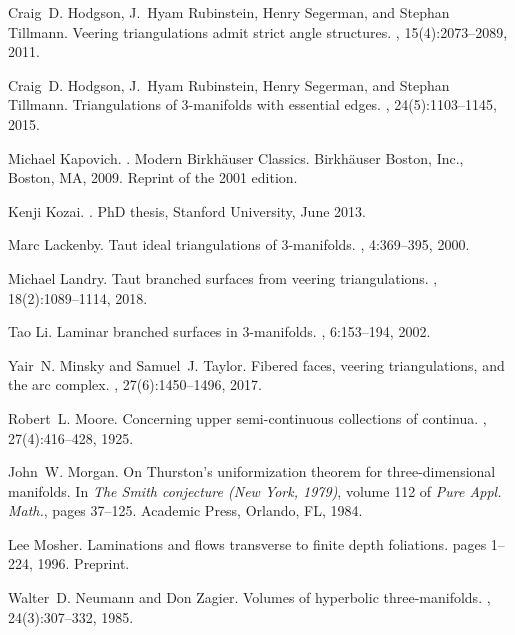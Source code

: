 \documentclass[12pt]{amsart}
\begin{document}
\begin{thebibliography}{10}
Craig~D. Hodgson, J.~Hyam Rubinstein, Henry Segerman, and Stephan Tillmann.
\newblock Veering triangulations admit strict angle structures.
, 15(4):2073--2089, 2011.

Craig~D. Hodgson, J.~Hyam Rubinstein, Henry Segerman, and Stephan Tillmann.
\newblock Triangulations of 3-manifolds with essential edges.
, 24(5):1103--1145, 2015.

Michael Kapovich.
.
\newblock Modern Birkh\"{a}user Classics. Birkh\"{a}user Boston, Inc., Boston,
  MA, 2009.
\newblock Reprint of the 2001 edition.

Kenji Kozai.
.
\newblock PhD thesis, Stanford University, June 2013.

Marc Lackenby.
\newblock Taut ideal triangulations of 3-manifolds.
, 4:369--395, 2000.

Michael Landry.
\newblock Taut branched surfaces from veering triangulations.
, 18(2):1089--1114, 2018.

Tao Li.
\newblock Laminar branched surfaces in 3-manifolds.
, 6:153--194, 2002.

Yair~N. Minsky and Samuel~J. Taylor.
\newblock Fibered faces, veering triangulations, and the arc complex.
, 27(6):1450--1496, 2017.

Robert~L. Moore.
\newblock Concerning upper semi-continuous collections of continua.
, 27(4):416--428, 1925.

John~W. Morgan.
\newblock On {T}hurston's uniformization theorem for three-dimensional
  manifolds.
\newblock In {\em The {S}mith conjecture ({N}ew {Y}ork, 1979)}, volume 112 of
  {\em Pure Appl. Math.}, pages 37--125. Academic Press, Orlando, FL, 1984.

Lee Mosher.
\newblock Laminations and flows transverse to finite depth foliations.
\newblock pages 1--224, 1996.
\newblock Preprint.

Walter~D. Neumann and Don Zagier.
\newblock Volumes of hyperbolic three-manifolds.
, 24(3):307--332, 1985.


\end{thebibliography}
\end{document}
